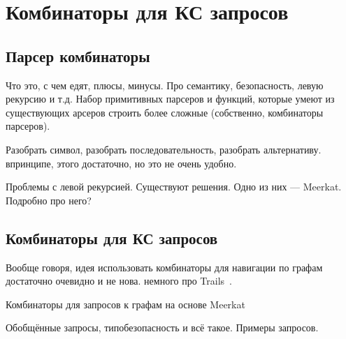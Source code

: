 \setchapterpreamble[u]{\margintoc}
\chapter{Комбинаторы для КС запросов}
\label{chpt:CombinatorsForCFPQ}

\section{Парсер комбинаторы}

Что это, с чем едят, плюсы, минусы. Про семантику, безопасность, левую рекурсию и т.д.
Набор примитивных парсеров и функций, которые умеют из существующих арсеров строить более сложные (собственно, комбинаторы парсеров).

Разобрать символ, разобрать последовательность, разобрать альтернативу. впринципе, этого достаточно, но это не очень удобно.

Проблемы с левой рекурсией.
Существуют решения. Одно из них --- Meerkat.
Подробно про него?

\section{Комбинаторы для КС запросов}

Вообще говоря, идея использовать комбинаторы для навигации по графам достаточно очевидно и не нова.
немного про Trails~\cite{Kroni:2013:PGA:2489837.2489844}.

Комбинаторы для запросов к графам на основе Meerkat~\cite{Verbitskaia:2018:PCC:3241653.3241655}

Обобщённые запросы, типобезопасность и всё такое.
Примеры запросов.
